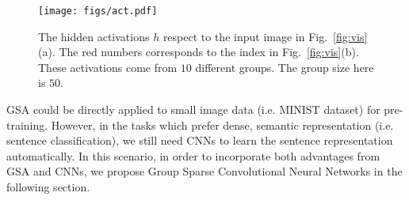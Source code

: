 \begin{figure}[!htbp]
\centering
\texttt{[image: figs/act.pdf]}
\caption{The hidden activations $h$ respect to the input image in Fig.~\ref{fig:vis}(a). The red numbers corresponds to the index in Fig.~\ref{fig:vis}(b). These activations come from $10$ different groups. The group size here is $50$.}
\label{fig:act}
\end{figure}

GSA could be directly applied to small image data (i.e. MINIST dataset) for pre-training. 
However, in the tasks which prefer dense, semantic representation (i.e. sentence classification), we still need CNNs to learn the sentence representation automatically. 
In this scenario, in order to incorporate both advantages from GSA and CNNs, we propose Group Sparse Convolutional Neural Networks in the following section.
